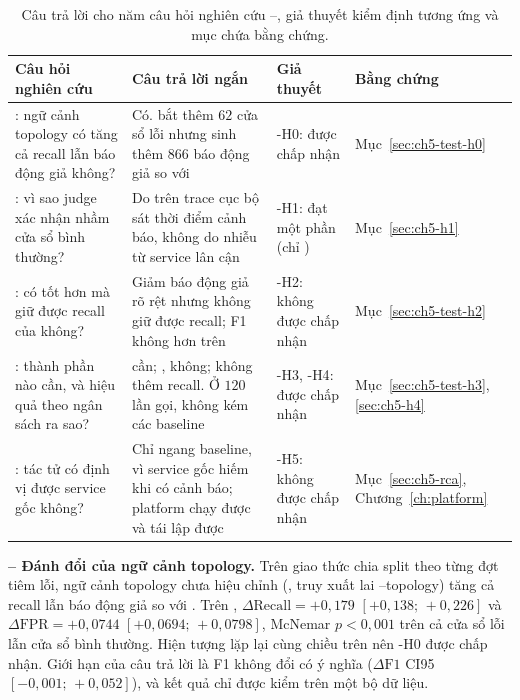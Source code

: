 \begin{table}[H]
  \centering
  \caption[Câu trả lời cho năm câu hỏi nghiên cứu]{Câu trả lời cho năm câu hỏi nghiên cứu --, giả thuyết kiểm định tương ứng và mục chứa bằng chứng.}
  \label{tab:ch8-rq}
  \tblfont
  \tblsetup
  \setlength{\tabcolsep}{3.5pt}
  \begin{tabularx}{\linewidth}{|>{\raggedright\arraybackslash}p{3.2cm}|Y|>{\raggedright\arraybackslash}p{2.2cm}|>{\raggedright\arraybackslash}p{2.0cm}|}
    \hline
    \textbf{Câu hỏi nghiên cứu} & \textbf{Câu trả lời ngắn} & \textbf{Giả thuyết} & \textbf{Bằng chứng} \\
    \hline
    : ngữ cảnh topology có tăng cả recall lẫn báo động giả không? & Có.  bắt thêm $62$ cửa sổ lỗi nhưng sinh thêm $866$ báo động giả so với  & \hyp{H0}: được chấp nhận & Mục~\ref{sec:ch5-test-h0} \\
    \hline
    : vì sao judge xác nhận nhầm cửa sổ bình thường? & Do  trên trace cục bộ sát thời điểm cảnh báo, không do nhiễu từ service lân cận & \hyp{H1}: đạt một phần (chỉ ) & Mục~\ref{sec:ch5-h1} \\
    \hline
    : \CTAV{} có tốt hơn  mà giữ được recall của  không? & Giảm báo động giả rõ rệt nhưng không giữ được recall; F1 không hơn  trên  & \hyp{H2}: không được chấp nhận & Mục~\ref{sec:ch5-test-h2} \\
    \hline
    : thành phần nào cần, và hiệu quả theo ngân sách ra sao? &  cần; ,  không;  không thêm recall. Ở $120$ lần gọi, \CTAV{} không kém các baseline & \hyp{H3}, \hyp{H4}: được chấp nhận & Mục~\ref{sec:ch5-test-h3}, \ref{sec:ch5-h4} \\
    \hline
    : tác tử  có định vị được service gốc không? & Chỉ ngang baseline, vì service gốc hiếm khi có cảnh báo; platform chạy được và tái lập được & \hyp{H5}: không được chấp nhận & Mục~\ref{sec:ch5-rca}, Chương~\ref{ch:platform} \\
    \hline
  \end{tabularx}
\end{table}

\textbf{ -- Đánh đổi của ngữ cảnh topology.}
Trên giao thức chia split theo từng đợt tiêm lỗi, ngữ cảnh topology chưa hiệu chỉnh (, truy xuất lai --topology) tăng cả recall lẫn báo động giả so với . Trên , $\Delta\text{Recall} = +0{,}179$ $[+0{,}138;\, +0{,}226]$ và $\Delta\text{FPR} = +0{,}0744$ $[+0{,}0694;\, +0{,}0798]$, McNemar $p < 0{,}001$ trên cả cửa sổ lỗi lẫn cửa sổ bình thường. Hiện tượng lặp lại cùng chiều trên  nên \hyp{H0} được chấp nhận. Giới hạn của câu trả lời là F1 không đổi có ý nghĩa ($\Delta\text{F1}$ CI95 $[-0{,}001;\, +0{,}052]$), và kết quả chỉ được kiểm trên một bộ dữ liệu. %

